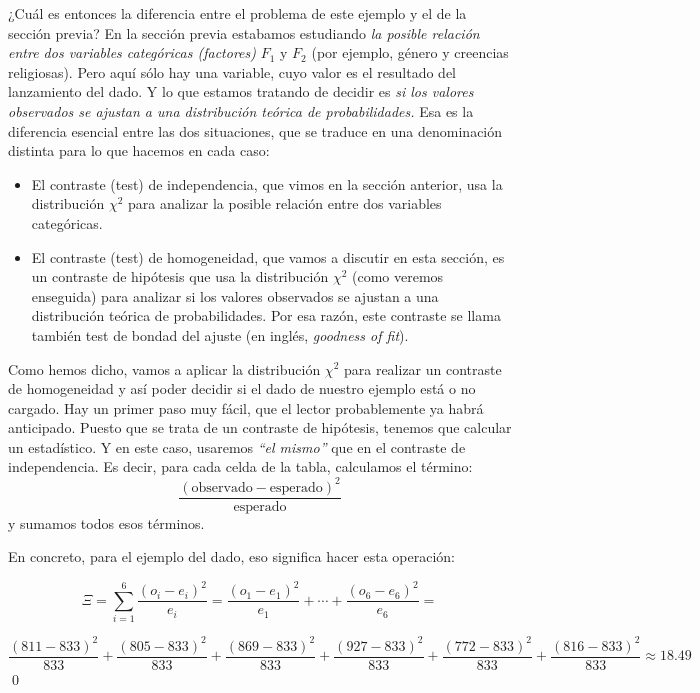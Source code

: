 ¿Cuál es entonces la diferencia entre el problema de este ejemplo y el de la sección previa? En la
sección previa estabamos estudiando {\em la posible relación entre dos variables categóricas (factores)} $F_1$
y $F_2$ (por ejemplo, género y creencias religiosas). Pero aquí sólo hay una variable, cuyo valor
es el resultado del lanzamiento del dado. Y lo que estamos tratando de decidir es {\em si los
valores observados se ajustan a una distribución teórica de probabilidades.} Esa es la diferencia
esencial entre las dos situaciones, que se traduce en una denominación distinta para lo que hacemos
en cada caso:
        \begin{itemize}
          \item El {\sf contraste (test) de independencia}, que vimos en la sección anterior, usa la distribución $\chi^2$ para analizar la posible relación entre dos variables categóricas.
          \item El {\sf contraste (test) de homogeneidad}, que vamos a discutir en esta sección, es un contraste de hipótesis que usa la distribución $\chi^2$ (como veremos enseguida) para analizar si los valores observados se ajustan a una distribución teórica de probabilidades. Por esa razón, este contraste se llama también {\sf test de bondad del ajuste} (en inglés, {\em goodness of fit}).
        \end{itemize}


Como hemos dicho, vamos a aplicar la distribución $\chi^2$ para realizar un contraste de homogeneidad y
así poder decidir si el dado de nuestro ejemplo está o no cargado. Hay un primer paso muy fácil,
que el lector probablemente ya habrá anticipado. Puesto que se trata de un contraste de hipótesis,
tenemos que calcular un estadístico. Y en este caso, usaremos {\em ``el mismo''} que en el contraste de
independencia. Es decir, para cada celda de la tabla, calculamos el término:
    \[\dfrac{(\mbox{observado}-\mbox{esperado})^2}{\mbox{esperado}}\]
y sumamos todos esos términos.
\begin{ejemplo}
En concreto, para el ejemplo del dado, eso significa hacer esta
operación:

\[\Xi=\sum_{i=1}^6\frac{(o_i-e_i)^2}{e_i}=\dfrac{(o_1-e_1)^2}{e_1}+\cdots+\dfrac{(o_6-e_6)^2}{e_6}=\]

{\scriptsize
\[
\frac{(811-833)^2}{833}+\frac{(805-833)^2}{833}+\frac{(869-833)^2}{833}+\frac{(927-833)^2}{833}
+\frac{(772-833)^2}{833}+\frac{(816-833)^2}{833}\approx 18.49
\]
}
\qed
\end{ejemplo}

